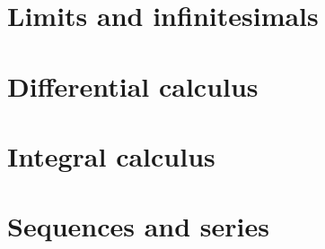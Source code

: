 \documentclass[a4paper,makeidx]{book}
\begin{document}
		\chapter{Limits and infinitesimals}

			

		\chapter{Differential calculus}

			
			
			

		\chapter{Integral calculus}

			
			
			
			
			
			
			




		\chapter{Sequences and series}

			

\end{document}
